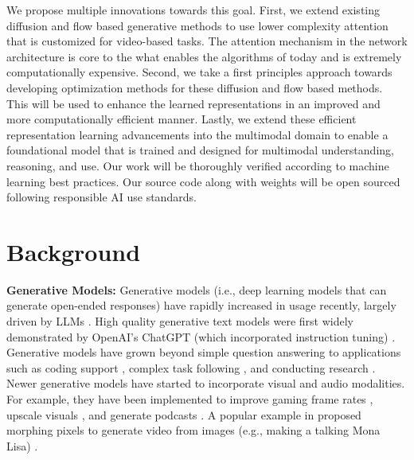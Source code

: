We propose multiple innovations towards this goal. First, we extend existing diffusion and flow based generative methods to use lower complexity attention that is customized for video-based tasks. The attention mechanism in the network architecture is core to the what enables the algorithms of today and is extremely computationally expensive. Second, we take a first principles approach towards developing optimization methods for these diffusion and flow based methods. This will be used to enhance the learned representations in an improved and more computationally efficient manner. Lastly, we extend these efficient representation learning advancements into the multimodal domain to enable a foundational model that is trained and designed for multimodal understanding, reasoning, and use. Our work will be thoroughly verified according to machine learning best practices. Our source code along with weights will be open sourced following responsible AI use standards. 


\section{Background}


\noindent\textbf{Generative Models:} 
Generative models (i.e., deep learning models that can generate open-ended responses) have rapidly increased in usage recently, largely driven by LLMs \cite{zhang2024appagent, chen2025mlrbench}. High quality generative text models were first widely demonstrated by OpenAI's ChatGPT (which incorporated instruction tuning) \cite{ouyang2022training}. Generative models have grown beyond simple question answering to applications such as coding support \cite{dinh2023large, su-etal-2024-evor, shinn2023reflexion, wei2024magicoder, jimenez2024swebench}, complex task following \cite{wang2023voyager, zhang2024appagent, yu2025exact}, and conducting research \cite{chen2025mlrbench, gabriel2024advancing}. Newer generative models have started to incorporate visual and audio modalities. For example, they have been implemented to improve gaming frame rates \cite{li2024neural, mercier2023efficient, zhu2025generative}, upscale visuals \cite{xu2025videogigagan, zhou2024upscaleavideo, liu2025ultravsr}, and generate podcasts \cite{park2025speechssm}. A popular example in proposed morphing pixels to generate video from images (e.g., making a talking Mona Lisa) \cite{siarohin2019first}. 


